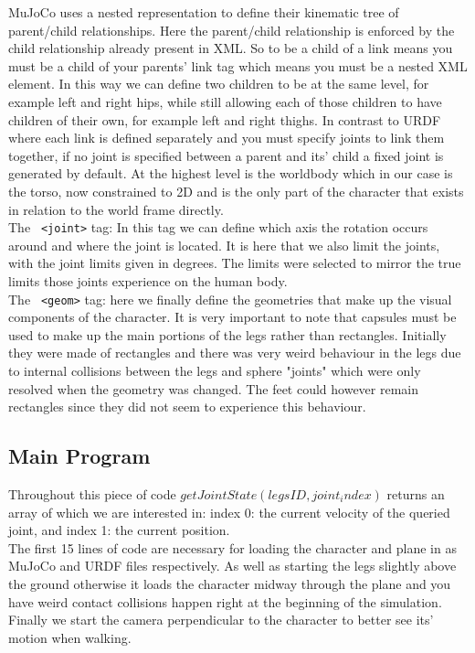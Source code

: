 \documentclass[12pt, a4paper]{article}
\begin{document}
MuJoCo uses a nested representation to define their kinematic tree of parent/child relationships. Here the parent/child relationship is enforced by the child relationship already present in XML. So to be a child of a link means you must be a child of your parents' link tag which means you must be a nested XML element. In this way we can define two children to be at the same level, for example left and right hips, while still allowing each of those children to have children of their own, for example left and right thighs. In contrast to URDF where each link is defined separately and you must specify joints to link them together, if no joint is specified between a parent and its' child a fixed joint is generated by default.  At the highest level is the worldbody which in our case is the torso, now constrained to 2D and is the only part of the character that exists in relation to the world frame directly.\\

The \verb; <joint>; tag: In this tag we can define which axis the rotation occurs around and where the joint is located. It is here that we also limit the joints, with the joint limits given in degrees. The limits were selected to mirror the true limits those joints experience on the human body. \\

The \verb; <geom>; tag: here we finally define the geometries that make up the visual components of the character. It is very important to note that capsules must be used to make up the main portions of the legs rather than rectangles. Initially they were made of rectangles and there was very weird behaviour in the legs due to internal collisions between the legs and sphere "joints" which were only resolved when the geometry was changed. The feet could however remain rectangles since they did not seem to experience this behaviour.\\ 

\subsection{Main Program}

Throughout this piece of code $getJointState(legsID, joint_index)$ returns an array of which we are interested in: index 0: the current velocity of the queried joint, and index 1: the current position.\\

The first 15 lines of code are necessary for loading the character and plane in as MuJoCo and URDF files respectively. As well as starting the legs slightly above the ground otherwise it loads the character midway through the plane and you have weird contact collisions happen right at the beginning of the simulation. Finally we start the camera perpendicular to the character to better see its' motion when walking.\\
\end{document}
